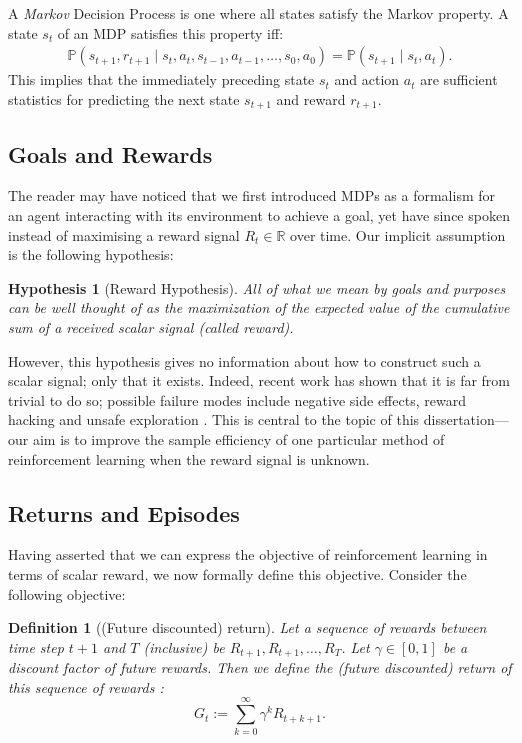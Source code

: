 \documentclass[11pt, a4paper, bibliography=totoc]{report}
\newcommand{\reals}{\mathbb{R}}
\renewcommand{\P}[1]{\mathbb{P}\left( #1 \right) }
\newtheorem{hypothesis}{Hypothesis}
\newtheorem{definition}{Definition}
\begin{document}
A \textit{Markov} Decision Process is one where all states satisfy the Markov property. A state $ s_t $ of an MDP satisfies this property iff:
\begin{align*}
\P{s_{t+1}, r_{t+1} \mid s_t, a_t, s_{t-1}, a_{t-1}, \dots, s_0, a_0 } = \P{s_{t+1} \mid s_t, a_t}.
\end{align*}
This implies that the immediately preceding state $ s_t $ and action $ a_t $ are sufficient statistics for predicting the next state $ s_{t+1} $ and reward $ r_{t+1} $.

\subsection{Goals and Rewards}
The reader may have noticed that we first introduced MDPs as a formalism for an agent interacting with its environment to achieve a goal, yet have since spoken instead of maximising a reward signal $ R_t \in \reals $ over time. Our implicit assumption is the following hypothesis:
\begin{hypothesis}[Reward Hypothesis]
\textit{All of what we mean by goals and purposes can be well thought of as the maximization of the expected value of the cumulative sum of a received scalar signal (called reward).} \cite[p.~53]{Sutton2018}
\end{hypothesis}
However, this hypothesis gives no information about how to construct such a scalar signal; only that it exists. Indeed, recent work has shown that it is far from trivial to do so; possible failure modes include negative side effects, reward hacking and unsafe exploration \cite{Amodei2016}. This is central to the topic of this dissertation---our aim is to improve the sample efficiency of one particular method of reinforcement learning when the reward signal is unknown.

\subsection{Returns and Episodes} \label{rets_and_episodes}
Having asserted that we can express the objective of reinforcement learning in terms of scalar reward, we now formally define this objective. Consider the following objective:
\begin{definition}[(Future discounted) return]
Let a sequence of rewards between time step $ t + 1 $ and $ T $ (inclusive) be $ R_{t+1}, R_{t+1}, \dots, R_T $. Let $ \gamma \in [0, 1] $ be a discount factor of future rewards. Then we define the (future discounted) return of this sequence of rewards \cite[p.~57]{Sutton2018}:
\begin{equation} \label{G_t}
G_t := \sum_{k=0}^{\infty} \gamma^k R_{t+k+1}.
\end{equation}
\end{definition}
\end{document}
